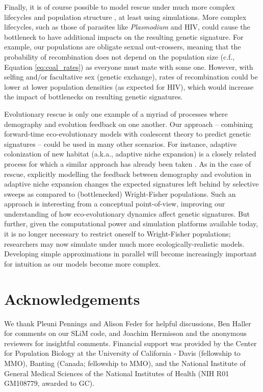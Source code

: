 \documentclass[]{article}
\begin{document}
Finally, it is of course possible to model rescue under much more complex lifecycles and population structure \citep[e.g., as expected for the evolution of malarial drug resistance;][]{kim2014population}, at least using simulations. 
More complex lifecycles, such as those of parasites like \textit{Plasmodium} and HIV, could cause the bottleneck to have additional impacts on the resulting genetic signature. 
For example, our populations are obligate sexual out-crossers, meaning that the probability of recombination does not depend on the population size (c.f., Equation \ref{eq:coal_rates}) as everyone must mate with some one. 
However, with selfing and/or facultative sex (genetic exchange), rates of recombination could be lower at lower population densities (as expected for HIV), which would increase the impact of bottlenecks on resulting genetic signatures.

Evolutionary rescue is only one example of a myriad of processes where demography and evolution feedback on one another. 
Our approach -- combining forward-time eco-evolutionary models with coalescent theory to predict genetic signatures -- could be used in many other scenarios.
For instance, adaptive colonization of new habitat (a.k.a., adaptive niche expansion) is a closely related process for which a similar approach has already been taken \citep{kim2010signatures}.
As in the case of rescue, explicitly modelling the feedback between demography and evolution in adaptive niche expansion changes the expected signatures left behind by selective sweeps as compared to (bottlenecked) Wright-Fisher populations.
Such an approach is interesting from a conceptual point-of-view, improving our understanding of how eco-evolutionary dynamics affect genetic signatures.
But further, given the computational power and simulation platforms available today, it is no longer necessary to restrict oneself to Wright-Fisher populations; researchers may now simulate under much more ecologically-realistic models.
Developing simple approximations in parallel will become increasingly important for intuition as our models become more complex.

\section*{Acknowledgements}
We thank Pleuni Pennings and Alison Feder for helpful discussions, Ben Haller for comments on our SLiM code, and Joachim Hermisson and the anonymous reviewers for insightful comments.
Financial support was provided by the Center for Population Biology at the University of California - Davis (fellowship to MMO), Banting (Canada; fellowship to MMO), and the National Institute of General Medical Sciences of the National Institutes of Health (NIH R01 GM108779, awarded to GC).
\end{document}
